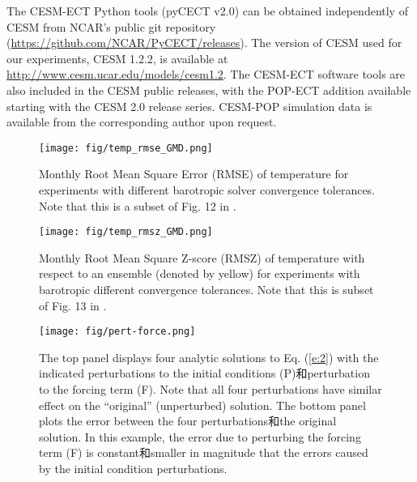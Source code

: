 The CESM-ECT Python tools (pyCECT v2.0) can be obtained independently of CESM from NCAR's public git repository (\url{https://github.com/NCAR/PyCECT/releases}).  The version of CESM used for our experiments, CESM 1.2.2, is available at \url{http://www.cesm.ucar.edu/models/cesm1.2}. The CESM-ECT software tools are also included in the CESM public releases, with the POP-ECT addition available starting with the CESM 2.0 release series. 
CESM-POP simulation data is available from the corresponding author upon request.


 


 



\clearpage
\begin{figure}[h]
\texttt{[image: fig/temp\_rmse\_GMD.png]}
\caption {Monthly Root Mean Square Error (RMSE) of temperature for experiments with different barotropic solver convergence tolerances. Note that this is a subset of Fig. 12 in \cite{yong2015}.}
\label{fig:rmse_temp}
\end{figure} 

\clearpage
 \begin{figure}[h]
 \begin{center}
 \texttt{[image: fig/temp\_rmsz\_GMD.png]}
 \end{center}
 \caption {Monthly Root Mean Square Z-score (RMSZ) of temperature with respect to an ensemble (denoted by yellow) for experiments with barotropic different convergence tolerances. Note that this is subset of Fig. 13 in \cite{yong2015}. }
 \label{fig:rmsz_temp_ens}
 \end{figure} 

\clearpage
\begin {figure}[h]
\centering
\texttt{[image: fig/pert-force.png]}
\caption{The top panel displays four analytic solutions to Eq. (\ref{e:2}) with the indicated perturbations to the initial conditions (P)和perturbation to the forcing term (F).  Note that all four perturbations have similar effect on the ``original'' (unperturbed) solution.  The bottom panel plots the error between the four perturbations和the original solution. In this example, the error due to perturbing the forcing term (F) is constant和smaller in magnitude that the errors caused by the initial condition perturbations.}
\label {fig:1Danalytical}
\end {figure}

